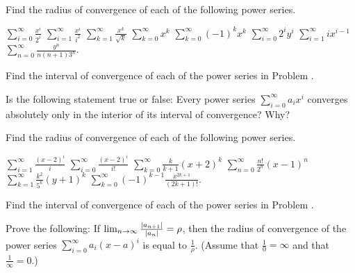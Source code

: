 \begin{exercises}

Find the radius of convergence of each of the
following power series.
\begin{exenum}
\x
$\sum_{i=0}^\infty \frac{x^i}{2^i}$
\x
$\sum_{i=1}^\infty \frac{x^i}{i^2}$
\x
$\sum_{k=1}^\infty \frac{x^k}{\sqrt{k}}$
\x
$\sum_{k=0}^\infty x^k$
\x
$\sum_{k=0}^\infty (-1)^kx^k$
\x
$\sum_{i=0}^\infty 2^iy^i$
\x
$\sum_{i=1}^\infty ix^{i-1}$
\x
$\sum_{n=0}^\infty \frac{y^n}{n(n+1)3^n}$.
\end{exenum}

Find the interval of convergence of each of the
power series in Problem .

Is the following statement true or false:
Every power series
$\sum_{i=0}^\infty a_ix^i$ converges absolutely
only in the interior of its interval of convergence?
Why?

Find the radius of convergence of each of the
following power series.
\begin{exenum}
\x
$\sum_{i=1}^\infty \frac{(x-2)^i}{i}$
\x
$\sum_{i=0}^\infty \frac{(x-2)^i}{i!}$
\x
$\sum_{k=0}^\infty \frac{k}{k+1} (x+2)^k$
\x
$\sum_{n=0}^\infty \frac{n!}{2^n} (x-1)^n$
\x
$\sum_{k=1}^\infty \frac{k^2}{5^k} (y+1)^k$
\x
$\sum_{k=0}^\infty (-1)^{k-1} \frac{x^{2k+1}}{(2k+1)!}$.
\end{exenum}

Find the interval of convergence of each of the power
series in Problem .

Prove the following:
If $\lim_{n\rightarrow\infty} \frac{|a_{n+1}|}{|a_n|} = \rho$,
then the radius of convergence of the power series
$\sum_{i=0}^\infty a_i(x-a)^i$ is equal to
$\frac1{\rho}$.
(Assume that $\frac10 = \infty$ and that
$\frac1\infty = 0$.)

\end{exercises}
